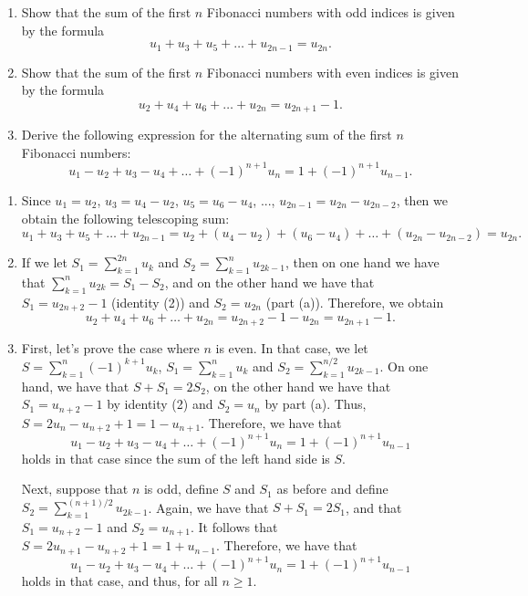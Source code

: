 \begin{exercise}
    \begin{enumerate}
        \item Show that the sum of the first $n$ Fibonacci numbers with odd indices is given by the formula
        $$u_1 + u_3 + u_5 + \dots + u_{2n-1} = u_{2n}.$$
        \item Show that the sum of the first $n$ Fibonacci numbers with even indices is given by the formula
        $$u_2 + u_4 + u_6 + \dots + u_{2n} = u_{2n+1} -1.$$
        \item Derive the following expression for the alternating sum of the first $n$ Fibonacci numbers:
        $$u_1 - u_2 + u_3 - u_4 + \dots + (-1)^{n+1}u_{n} = 1 + (-1)^{n+1}u_{n-1}.$$
    \end{enumerate}
\end{exercise}

\begin{solution}
    \begin{enumerate}
        \item Since $u_1 = u_2$, $u_3 = u_4 - u_2$, $u_5 = u_6 - u_4$, ..., $u_{2n - 1} = u_{2n} - u_{2n - 2}$, then we obtain the following telescoping sum:
        $$u_1 + u_3 + u_5 + \dots + u_{2n-1} = u_2 + (u_4 - u_2) + (u_6 - u_4) + \dots + (u_{2n} - u_{2n - 2}) = u_{2n}.$$
        \item If we let $S_1 = \sum_{k=1}^{2n}u_k$ and $S_2 = \sum_{k=1}^{n}u_{2k-1}$, then on one hand we have that $\sum_{k=1}^{n}u_{2k} = S_1 - S_2$, and on the other hand we have that $S_1 = u_{2n+2} - 1$ (identity (2)) and $S_2 = u_{2n}$ (part (a)). Therefore, we obtain
        $$u_2 + u_4 + u_6 + \dots + u_{2n} = u_{2n+2} - 1 - u_{2n} = u_{2n + 1} - 1.$$
        \item First, let's prove the case where $n$ is even. In that case, we let $S = \sum_{k=1}^{n}(-1)^{k+1}u_k$, $S_1 = \sum_{k=1}^{n}u_k$ and $S_2 = \sum_{k=1}^{n/2}u_{2k-1}$. On one hand, we have that $S + S_1 = 2S_2$, on the other hand we have that $S_1 = u_{n+2} - 1$ by identity (2) and $S_2 = u_n$ by part (a). Thus, $S = 2u_n - u_{n+2} + 1 = 1 - u_{n+1}$. Therefore, we have that
        $$u_1 - u_2 + u_3 - u_4 + \dots + (-1)^{n+1}u_{n} = 1 + (-1)^{n+1}u_{n-1}$$
        holds in that case since the sum of the left hand side is $S$. 
        
        Next, suppose that $n$ is odd, define $S$ and $S_1$ as before and define $S_2 = \sum_{k=1}^{(n+1)/2}u_{2k - 1}$. Again, we have that $S + S_1 = 2S_1$, and that $S_1 = u_{n+2} - 1$ and $S_2 = u_{n+1}$. It follows that $S = 2u_{n+1} - u_{n+2} + 1 = 1 + u_{n-1}$. Therefore, we have that
        $$u_1 - u_2 + u_3 - u_4 + \dots + (-1)^{n+1}u_{n} = 1 + (-1)^{n+1}u_{n-1}$$
        holds in that case, and thus, for all $n \geq 1$. \\
    \end{enumerate}
\end{solution}

